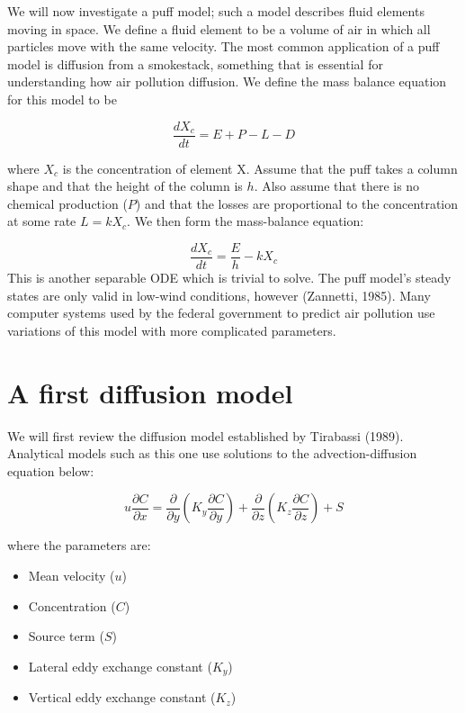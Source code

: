 \documentclass{article}
\begin{document}
We will now investigate a puff model; such a model describes fluid elements moving in space. We define a fluid element
to be a volume of air in which all particles move with the same velocity. The most common application of a puff model is diffusion from a 
smokestack, something that is essential for understanding how air pollution diffusion. We define the mass balance equation for this model
to be 

\begin{equation}
    \frac{dX_{c}}{dt} = E + P - L - D
\end{equation}

where $X_{c}$ is the concentration of element X. Assume that the puff takes a column shape and that the height of the column is $h$.
Also assume that there is no chemical production ($P$) and that the losses are proportional to the concentration at some rate $L = kX_{c}$. 
We then form the mass-balance equation:

\begin{equation}
    \frac{dX_{c}}{dt} = \frac{E}{h} - kX_{c}
\end{equation}
This is another separable ODE which is trivial to solve. The puff model's steady states are only valid in low-wind conditions, however (Zannetti, 1985).
Many computer systems used by the federal government to predict air pollution use variations of this model with more complicated parameters.

\section{A first diffusion model}

We will first review the diffusion model established by Tirabassi (1989). Analytical models such as this one use solutions to the 
advection-diffusion equation below:

\begin{equation}
    u\frac{\partial C}{\partial x} = \frac{\partial}{\partial y} (K_y \frac{\partial C}{\partial y}) + \frac{\partial}{\partial z} (K_z \frac{\partial C}{\partial z}) + S
\end{equation}

where the parameters are:

\begin{itemize}
    \item Mean velocity ($u$)
    \item Concentration ($C$)
    \item Source term ($S$)
    \item Lateral eddy exchange constant ($K_y$)
    \item Vertical eddy exchange constant ($K_z$)
 \end{itemize}
 
\end{document}
